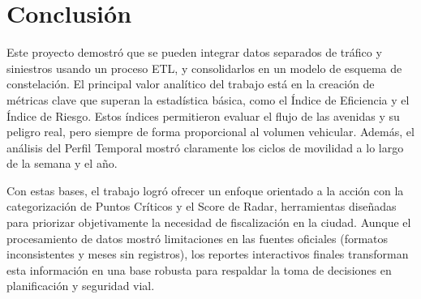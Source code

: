\section{Conclusi\'on}

Este proyecto demostró que se pueden integrar datos separados de tráfico y 
siniestros usando un proceso ETL, y consolidarlos en un modelo de esquema de 
constelación. El principal valor analítico del trabajo está en la creación de 
métricas clave que superan la estadística básica, como el Índice de Eficiencia 
y el Índice de Riesgo. Estos índices permitieron evaluar el flujo de las 
avenidas y su peligro real, pero siempre de forma proporcional al volumen 
vehicular. Además, el análisis del Perfil Temporal mostró claramente los 
ciclos de movilidad a lo largo de la semana y el año.

Con estas bases, el trabajo logró ofrecer un enfoque orientado a la acción con 
la categorización de Puntos Críticos y el Score de Radar, herramientas 
diseñadas para priorizar objetivamente la necesidad de fiscalización en la 
ciudad. Aunque el procesamiento de datos mostró limitaciones en las fuentes 
oficiales (formatos inconsistentes y meses sin registros), los reportes 
interactivos finales transforman esta información en una base robusta para 
respaldar la toma de decisiones en planificación y seguridad vial.

